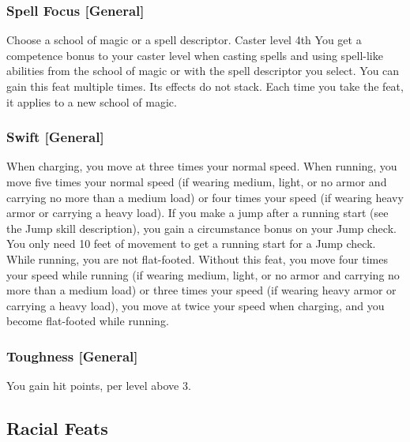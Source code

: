 \subsubsection{Spell Focus [General]}
Choose a school of magic or a spell descriptor.
 Caster level 4th
 You get a  competence bonus to your caster level when casting spells and using spell-like abilities from the school of magic or with the spell descriptor you select.
 You can gain this feat multiple times. Its effects do not stack. Each time you take the feat, it applies to a new school of magic.


\subsubsection{Swift [General]}
 When charging, you move at three times your normal speed. When running, you move five times your normal speed (if wearing medium, light, or no armor and carrying no more than a medium load) or four times your speed (if wearing heavy armor or carrying a heavy load).  If you make a jump after a running start (see the Jump skill description), you gain a  circumstance bonus on your Jump check. You only need 10 feet of movement to get a running start for a Jump check. While running, you are not flat-footed.
 Without this feat, you move four times your speed while running (if wearing medium, light, or no armor and carrying no more than a medium load) or three times your speed (if wearing heavy armor or carrying a heavy load), you move at twice your speed when charging, and you become flat-footed while running.

\subsubsection{Toughness [General]}
 You gain  hit points,  per level above 3.

\subsection{Racial Feats}


